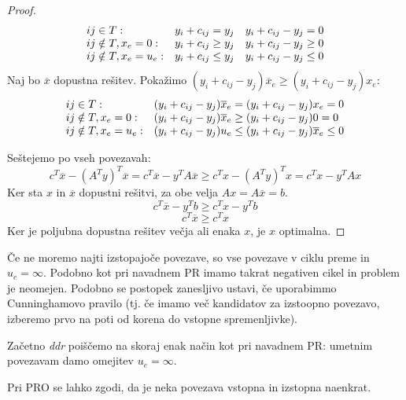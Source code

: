 \documentclass[11pt, a4paper]{article}
\begin{document}
    \begin{proof}
        \[
            \begin{array}{l r r}
                ij \in T: & y_i + c_{ij} = y_j & y_i + c_{ij} - y_j = 0 \\
                ij \notin T, x_e = 0: & y_i + c_{ij} \ge y_j & y_i + c_{ij} - y_j \ge 0 \\
                ij \notin T, x_e = u_e: & y_i + c_{ij} \le y_j & y_i + c_{ij} - y_j \le 0
            \end{array}    
        \]
        Naj bo \(\overline{x}\) dopustna rešitev. Pokažimo \((y_i + c_{ij} - y_j) \overline{x}_e \ge (y_i + c_{ij} - y_j) x_e\):
        \[
            \begin{array}{l l}
                ij \in T: & (y_i + c_{ij} - y_j) \overline{x}_e = (y_i + c_{ij} - y_j) x_e = 0 \\
                ij \notin T, x_e = 0: & (y_i + c_{ij} - y_j) \overline{x}_e \ge (y_i + c_{ij} - y_j) 0 = 0 \\
                ij \notin T, x_e = u_e: & (y_i + c_{ij} - y_j) u_e \le (y_i + c_{ij} - y_j) \overline{x}_e \le 0
            \end{array}    
        \]

        Seštejemo po vseh povezavah:
        \[
            c^T \overline{x} - (A^T y)^T \overline{x} = c^T \overline{x} - y^T A \overline{x} \ge c^T x - (A^T y)^T x = c^T x - y^T A x
        \]
        Ker sta \(x\) in \(\overline{x}\) dopustni rešitvi, za obe velja \(Ax=A \overline{x} = b\).
        \[
            c^T \overline{x} - y^T b \ge c^T x - y^T b     
        \]
        \[
            c^T \overline{x} \ge c^T x 
        \]
        Ker je poljubna dopustna rešitev večja ali enaka \(x\), je \(x\) optimalna.
    \end{proof}

    Če ne moremo najti izstopajoče povezave, so vse povezave v ciklu preme in \(u_e=\infty\). Podobno kot pri navadnem PR imamo takrat negativen cikel in problem je neomejen. Podobno se postopek zanesljivo ustavi, če uporabimmo Cunninghamovo pravilo (tj. če imamo več kandidatov za izstoopno povezavo, izberemo prvo na poti od korena do vstopne spremenljivke).
    \par
    Začetno \textit{ddr} poiščemo na skoraj enak način kot pri navadnem PR: umetnim povezavam damo omejitev \(u_e=\infty\).

    \begin{remark}
        Pri PRO se lahko zgodi, da je neka povezava vstopna in izstopna naenkrat.
    \end{remark}
\end{document}
